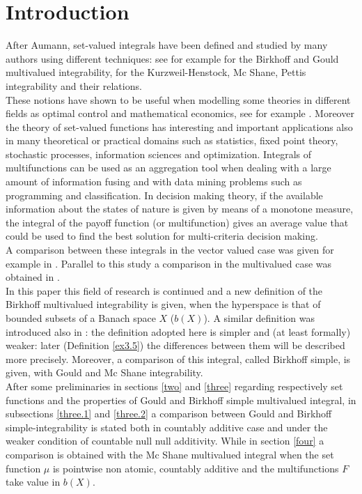 \documentclass[11pt,a4paper,twoside]{amsart}
\begin{document}
\section{Introduction}\label{one}
After Aumann, set-valued integrals have been defined and studied by
many authors using different techniques: see for example 
\cite{cr2004,cr2005,tre,cg2014,cgsub1,g2008,gcsub,vm,pgcsub,c2013,ccgs2014} for the Birkhoff and Gould multivalued integrability, 
\cite{DPM,dpmb1,dpm3,dpm4,bs2004,bs2012,bcs2014,cs2014,cs2015,ebs2004,ebs2005}
for the Kurzweil-Henstock, Mc Shane, Pettis integrability and their relations.\\
These notions have shown to be useful when modelling some theories in different fields as  optimal
control and mathematical economics, see for example \cite{am,dps1,dpms2014,cc}.
Moreover the theory of set-valued functions has interesting and important applications also
in many theoretical or practical domains such as 
statistics, fixed point theory, stochastic processes, information sciences and optimization.
Integrals of multifunctions can be used as an aggregation tool
when dealing with a large amount of information fusing and with data mining
problems such as programming and classification.
In decision making theory, if the available information about the states
of nature is given by means of a monotone measure, the integral of the payoff
function (or multifunction) gives an average value that could be used to find
the best solution for multi-criteria decision making.
\\
A comparison between these integrals in the vector valued  case was given for example in \cite{DPMILL,fremlin,DPVM,pot2007,pot2006,r2005,r2009a,r2009b,cs2014,cs2015}.
Parallel to this study a comparison in the multivalued case was obtained in \cite{ms2001,ms2002,bs2012,dpm4}.\\
In this paper this field of research is continued and a new definition of the Birkhoff multivalued integrability is given, when the hyperspace is that of bounded subsets of a Banach space $X$ ($b(X)$).  A similar definition was introduced also in \cite{cgsub1}:
the definition adopted here is simpler and (at least formally) weaker: later (Definition \ref{ex3.5})  the differences between them will be described more precisely.
 Moreover, a comparison of this integral, called Birkhoff simple, is given, with Gould and Mc Shane integrability.\\
After some preliminaries in sections \ref{two} and \ref{three} regarding respectively set functions and the properties of Gould and Birkhoff simple multivalued integral,
in subsections \ref{three.1} and \ref{three.2} a comparison between Gould and Birkhoff simple-integrability is stated both in countably additive case and under the weaker condition of
 countable null null additivity.
While in section \ref{four} a comparison is obtained with the Mc Shane multivalued integral when the set function $\mu$ is pointwise non atomic, countably additive and the multifunctions $F$ take value in $b(X)$.
\end{document}
